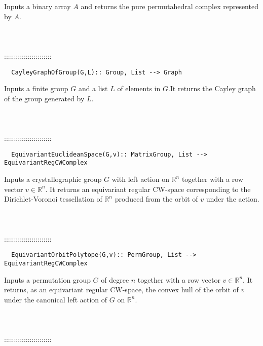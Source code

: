 \documentclass[a4paper,11pt]{report}
\begin{document}
{ 

 Inputs a binary array $A$ and returns the pure permutahedral complex represented by $A$. \\
 \\
 \\
 \\
 ::::::::::::::::::::::::\\
 
\begin{verbatim}  CayleyGraphOfGroup(G,L):: Group, List --> Graph
\end{verbatim}


 

 Inputs a finite group $G$ and a list $L$ of elements in $G$.It returns the Cayley graph of the group generated by $L$. \\
 \\
 \\
 \\
 ::::::::::::::::::::::::\\
 
\begin{verbatim}  EquivariantEuclideanSpace(G,v):: MatrixGroup, List --> EquivariantRegCWComplex
\end{verbatim}


 

 Inputs a crystallographic group $G$ with left action on $\mathbb R^n$ together with a row vector $v \in \mathbb R^n$. It returns an equivariant regular CW-space corresponding to the
Dirichlet-Voronoi tessellation of $\mathbb R^n$ produced from the orbit of $v$ under the action. \\
 \\
 \\
 \\
 ::::::::::::::::::::::::\\
 
\begin{verbatim}  EquivariantOrbitPolytope(G,v):: PermGroup, List --> EquivariantRegCWComplex
\end{verbatim}


 

 Inputs a permutation group $G$ of degree $n$ together with a row vector $v \in \mathbb R^n$. It returns, as an equivariant regular CW-space, the convex hull of the orbit
of $v$ under the canonical left action of $G$ on $\mathbb R^n$. \\
 \\
 \\
 \\
 ::::::::::::::::::::::::\\
 
}
\end{document}
